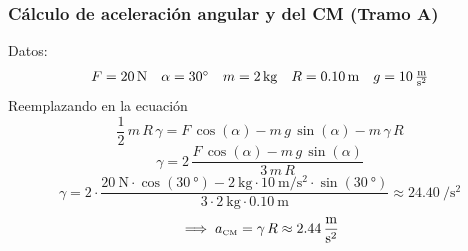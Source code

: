 \begin{frame}
	\frametitle{Cálculo de aceleración angular y del CM (Tramo A)}
	Datos:
	$$ \begin{array}{c c c c c}
			F = \qty{20}{\newton} & \alpha = \qty{30}{\degree} & m = \qty{2}{\kilo\gram} & R= \qty{0.10}{\meter} & g =\qty[per-mode=fraction]{10}{\meter\per\second\squared}
		\end{array} $$
	Reemplazando en la ecuación
	$$ \frac{1}{2}\,m\,R\,\gamma = F\,\cos(\alpha) - m\,g\,\sin(\alpha) - m\,\gamma\,R  $$
	$$ \gamma = 2\,\frac{F\,\cos(\alpha) - m\,g\,\sin(\alpha)}{3\,m\,R} $$
	$$ \gamma = 2\cdot\frac{\qty{20}{\newton}\cdot\cos(\qty{30}{\degree}) - \qty{2}{\kilo\gram}\cdot\qty{10}{\meter\per\second\squared}\cdot\sin(\qty{30}{\degree})}{3\cdot\qty{2}{\kilo\gram}\cdot\qty{0.10}{\meter}} \approx \qty{24.40}{\per\second\squared} $$
	$$ \implies a_{\tcm} = \gamma\,R \approx \qty[per-mode = fraction]{2.44}{\meter\per\second\squared} $$

\end{frame}

